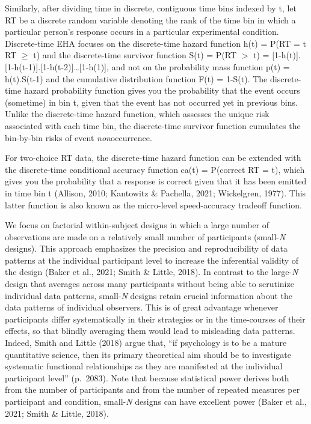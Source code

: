 \documentclass[
  man,floatsintext]{apa6}
\begin{document}
Similarly, after dividing time in discrete, contiguous time bins indexed by t, let RT be a discrete random variable denoting the rank of the time bin in which a particular person's response occurs in a particular experimental condition. Discrete-time EHA focuses on the discrete-time hazard function h(t) = P(RT = t\textbar{} RT \(\geq\) t) and the discrete-time survivor function S(t) = P(RT \(>\) t) = {[}1-h(t){]}.{[}1-h(t-1){]}.{[}1-h(t-2){]}\ldots{[}1-h(1){]}, and not on the probability mass function p(t) = h(t).S(t-1) and the cumulative distribution function F(t) = 1-S(t). The discrete-time hazard probability function gives you the probability that the event occurs (sometime) in bin t, given that the event has not occurred yet in previous bins. Unlike the discrete-time hazard function, which assesses the unique risk associated with each time bin, the discrete-time survivor function cumulates the bin-by-bin risks of event \emph{non}occurrence.

For two-choice RT data, the discrete-time hazard function can be extended with the discrete-time conditional accuracy function ca(t) = P(correct \textbar{} RT = t), which gives you the probability that a response is correct given that it has been emitted in time bin t (Allison, 2010; Kantowitz \& Pachella, 2021; Wickelgren, 1977). This latter function is also known as the micro-level speed-accuracy tradeoff function.

We focus on factorial within-subject designs in which a large number of observations are made on a relatively small number of participants (small-\emph{N} designs). This approach emphasizes the precision and reproducibility of data patterns at the individual participant level to increase the inferential validity of the design (Baker et al., 2021; Smith \& Little, 2018). In contrast to the large-\emph{N} design that averages across many participants without being able to scrutinize individual data patterns, small-\emph{N} designs retain crucial information about the data patterns of individual observers. This is of great advantage whenever participants differ systematically in their strategies or in the time-courses of their effects, so that blindly averaging them would lead to misleading data patterns. Indeed, Smith and Little (2018) argue that, ``if psychology is to be a mature quantitative science, then its primary theoretical aim should be to investigate systematic functional relationships as they are manifested at the individual participant level'' (p.~2083). Note that because statistical power derives both from the number of participants and from the number of repeated measures per participant and condition, small-\emph{N} designs can have excellent power (Baker et al., 2021; Smith \& Little, 2018).
\end{document}
